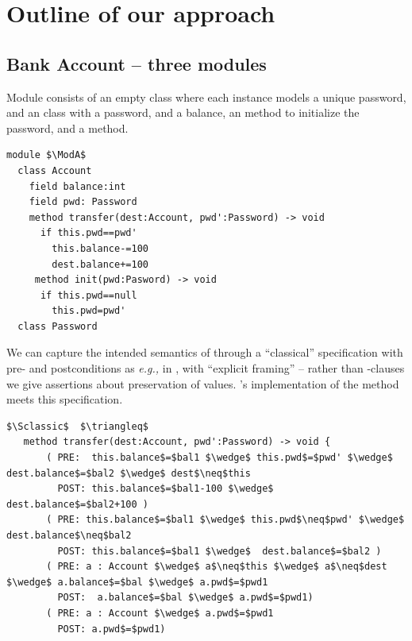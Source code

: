 

\section{Outline of our approach}
\label{s:outline}

 \subsection{Bank Account -- three modules}
\label{s:bank}
  
Module \ModA consists of an empty 
 class where each instance models a unique password, and an   class with a password, and a balance, an  method to 
initialize the password, and 
a
 method. 
%
%
%
%
% 
\begin{lstlisting}[mathescape=true, language=Chainmail, frame=lines]
module $\ModA$
  class Account
    field balance:int 
    field pwd: Password
    method transfer(dest:Account, pwd':Password) -> void
      if this.pwd==pwd'
        this.balance-=100
        dest.balance+=100
     method init(pwd:Pasword) -> void
      if this.pwd==null
        this.pwd=pwd'
  class Password
\end{lstlisting}
%
\noindent 
We can capture the intended
semantics of  
through  {a}  ``classical''
specification with pre- and postconditions as \emph{e.g.,} in \cite{Leavens-etal07,dafny13},
with ``explicit framing'' --   
 {rather than -clauses we give assertions   about preservation of values.}
\ModA's implementation of the  method meets
this specification.



\begin{lstlisting}[mathescape=true, frame=lines, language=Chainmail]
$\Sclassic$  $\triangleq$
   method transfer(dest:Account, pwd':Password) -> void {
       ( PRE:  this.balance$=$bal1 $\wedge$ this.pwd$=$pwd' $\wedge$ dest.balance$=$bal2 $\wedge$ dest$\neq$this 
         POST: this.balance$=$bal1-100 $\wedge$  dest.balance$=$bal2+100 )
       ( PRE: this.balance$=$bal1 $\wedge$ this.pwd$\neq$pwd' $\wedge$ dest.balance$\neq$bal2
         POST: this.balance$=$bal1 $\wedge$  dest.balance$=$bal2 )
       ( PRE: a : Account $\wedge$ a$\neq$this $\wedge$ a$\neq$dest  $\wedge$ a.balance$=$bal $\wedge$ a.pwd$=$pwd1
         POST:  a.balance$=$bal $\wedge$ a.pwd$=$pwd1)
       ( PRE: a : Account $\wedge$ a.pwd$=$pwd1  
         POST: a.pwd$=$pwd1)       
\end{lstlisting}
 
